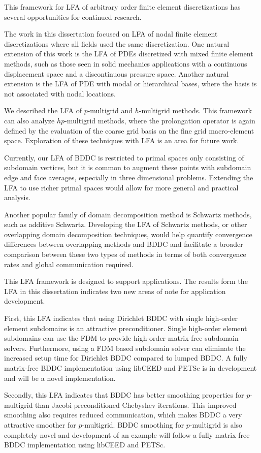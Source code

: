 This framework for LFA of arbitrary order finite element discretizations has several opportunities for continued research.

The work in this dissertation focused on LFA of nodal finite element discretizations where all fields used the same discretization.
One natural extension of this work is the LFA of PDEs discretized with mixed finite element methods, such as those seen in solid mechanics applications with a continuous displacement space and a discontinuous pressure space.
Another natural extension is the LFA of PDE with modal or hierarchical bases, where the basis is not associated with nodal locations.

We described the LFA of $p$-multigrid and $h$-multigrid methods.
This framework can also analyze $hp$-multigrid methods, where the prolongation operator is again defined by the evaluation of the coarse grid basis on the fine grid macro-element space.
Exploration of these techniques with LFA is an area for future work.

Currently, our LFA of BDDC is restricted to primal spaces only consisting of subdomain vertices, but it is common to augment these points with subdomain edge and face averages, especially in three dimensional problems.
Extending the LFA to use richer primal spaces would allow for more general and practical analysis.

Another popular family of domain decomposition method is Schwartz methods, such as additive Schwartz.
Developing the LFA of Schwartz methods, or other overlapping domain decomposition techniques, would help quantify convergence differences between overlapping methods and BDDC and facilitate a broader comparison between these two types of methods in terms of both convergence rates and global communication required.

This LFA framework is designed to support applications.
The results form the LFA in this dissertation indicates two new areas of note for application development.

First, this LFA indicates that using Dirichlet BDDC with single high-order element subdomains is an attractive preconditioner.
Single high-order element subdomains can use the FDM to provide high-order matrix-free subdomain solvers.
Furthermore, using a FDM based subdomain solver can eliminate the increased setup time for Dirichlet BDDC compared to lumped BDDC.
A fully matrix-free BDDC implementation using libCEED and PETSc is in development and will be a novel implementation.

Secondly, this LFA indicates that BDDC has better smoothing properties for $p$-multigrid than Jacobi preconditioned Chebyshev iterations.
This improved smoothing also requires reduced communication, which makes BDDC a very attractive smoother for $p$-multigrid.
BDDC smoothing for $p$-multigrid is also completely novel and development of an example will follow a fully matrix-free BDDC implementation using libCEED and PETSc.
